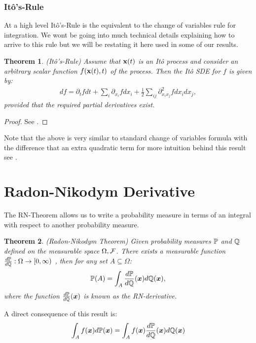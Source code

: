 \documentclass[a4paper,12pt,twoside,openright]{report}
\newtheorem{theorem}{Theorem}
\theoremstyle{definition}
\begin{document}
\subsubsection{Itô's-Rule}

At a high level Itô's-Rule is the equivalent to the change of variables rule for integration. We wont be going into much technical details explaining how to arrive to this rule but we will be restating it here used in some of our results. 

\begin{theorem}
  (Itô's-Rule) Assume that $\rvx(t)$ is an Itô process and consider an arbitrary scalar function $f(\rvx(t), t)$ of the process. Then the Itô SDE for $f$ is given by:
  \begin{align}\label{eq:ito_rule}
      df = \partial_t f dt + \sum_i \partial_{{x_i}} f dx_i + \frac{1}{2}\sum_{ij} \partial^2_{{x_i}{x_j}} f dx_i dx_j,
  \end{align}
  provided that the required partial derivatives exist. 
\end{theorem}
\begin{proof}
See \cite{oksendal2003stochastic}.
\end{proof}
Note that the above is very similar to standard change of variables formula with the difference that an extra quadratic term for more intuition behind this result see \cite[Chapter~4]{sarkka2019applied}.
\section{Radon-Nikodym Derivative}

The RN-Theorem allows us to write a probability measure in terms of an integral with respect to another probability measure. 

\begin{theorem}
(Radon-Nikodym Theorem)
Given probability measures $\P$ and $\Q$ defined on the measurable space $\Omega, \calF$. There exists a measurable function $\frac{d\P}{d\Q}:\Omega \rightarrow [0, \infty)$ , then for any  set $A \subseteq  \Omega$:
\begin{align}
    \P(A) = \int_{A} \frac{d\P}{d\Q}(\vx) d\Q(\vx),
\end{align}
where the function $\frac{d\P}{d\Q}(\vx)$ is known as the RN-derivative.
\end{theorem}

A direct consequence of this result is:
\begin{align*}
    \int_A f(\vx) d\P(\vx) =  \int_{A} f(\vx)  \frac{d\P}{d\Q}(\vx)  d\Q(\vx)
\end{align*}
\end{document}
